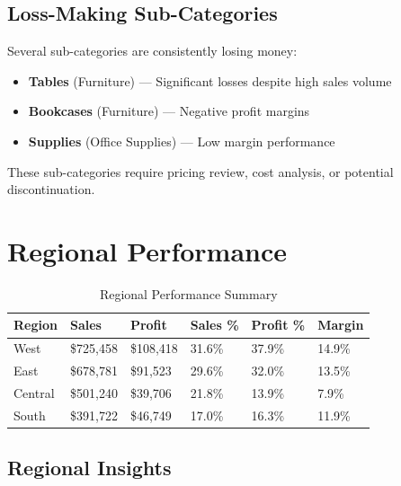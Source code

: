 \documentclass[11pt,a4paper]{article}
\begin{document}
\subsection{Loss-Making Sub-Categories}

\begin{tcolorbox}[
    colback=warningred!5,
    colframe=warningred!60,
    title=\textbf{Value Destruction Alert},
    fonttitle=\bfseries,
    arc=6pt
]
Several sub-categories are consistently losing money:
\begin{itemize}[leftmargin=*]
    \item \textbf{Tables} (Furniture) — Significant losses despite high sales volume
    \item \textbf{Bookcases} (Furniture) — Negative profit margins
    \item \textbf{Supplies} (Office Supplies) — Low margin performance
\end{itemize}
These sub-categories require pricing review, cost analysis, or potential discontinuation.
\end{tcolorbox}

\section{Regional Performance}

\begin{table}[H]
\centering
\begin{tabular}{@{}p{2.5cm} p{2.5cm} p{2.5cm} p{2cm} p{2cm} p{2cm}@{}}
\toprule
\rowcolor{primary!10}
\textbf{Region} & \textbf{Sales} & \textbf{Profit} & \textbf{Sales \%} & \textbf{Profit \%} & \textbf{Margin} \\
\midrule
\rowcolor{accent!5}
West & \$725,458 & \$108,418 & 31.6\% & 37.9\% & \textcolor{profitgreen}{14.9\%} \\
East & \$678,781 & \$91,523 & 29.6\% & 32.0\% & 13.5\% \\
Central & \$501,240 & \$39,706 & 21.8\% & 13.9\% & \textcolor{warningred}{7.9\%} \\
\rowcolor{lightgray}
South & \$391,722 & \$46,749 & 17.0\% & 16.3\% & 11.9\% \\
\bottomrule
\end{tabular}
\caption{Regional Performance Summary}
\end{table}

\subsection{Regional Insights}
\end{document}
